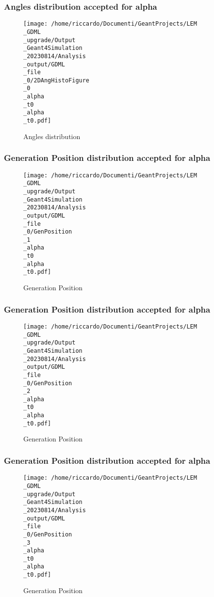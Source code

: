 \documentclass[8pt]{beamer}
\begin{document}
            \begin{frame}
                \frametitle{Angles distribution accepted for alpha}
            
        \begin{figure}[h]
            \centering
            \texttt{[image: /home/riccardo/Documenti/GeantProjects/LEM\\\_GDML\\\_upgrade/Output\\\_Geant4Simulation\\\_20230814/Analysis\\\_output/GDML\\\_file\\\_0/2DAngHistoFigure\\\_0\\\_alpha\\\_t0\\\_alpha\\\_t0.pdf]}
            \caption{Angles distribution}
        \end{figure}
        
            \end{frame}
            
            \begin{frame}
                \frametitle{Generation Position distribution accepted for alpha}
            
        \begin{figure}[h]
            \centering
            \texttt{[image: /home/riccardo/Documenti/GeantProjects/LEM\\\_GDML\\\_upgrade/Output\\\_Geant4Simulation\\\_20230814/Analysis\\\_output/GDML\\\_file\\\_0/GenPosition\\\_1\\\_alpha\\\_t0\\\_alpha\\\_t0.pdf]}
            \caption{Generation Position}
        \end{figure}
        
            \end{frame}
            
            \begin{frame}
                \frametitle{Generation Position distribution accepted for alpha}
            
        \begin{figure}[h]
            \centering
            \texttt{[image: /home/riccardo/Documenti/GeantProjects/LEM\\\_GDML\\\_upgrade/Output\\\_Geant4Simulation\\\_20230814/Analysis\\\_output/GDML\\\_file\\\_0/GenPosition\\\_2\\\_alpha\\\_t0\\\_alpha\\\_t0.pdf]}
            \caption{Generation Position}
        \end{figure}
        
            \end{frame}
            
            \begin{frame}
                \frametitle{Generation Position distribution accepted for alpha}
            
        \begin{figure}[h]
            \centering
            \texttt{[image: /home/riccardo/Documenti/GeantProjects/LEM\\\_GDML\\\_upgrade/Output\\\_Geant4Simulation\\\_20230814/Analysis\\\_output/GDML\\\_file\\\_0/GenPosition\\\_3\\\_alpha\\\_t0\\\_alpha\\\_t0.pdf]}
            \caption{Generation Position}
        \end{figure}
        
            \end{frame}
            
\end{document}
